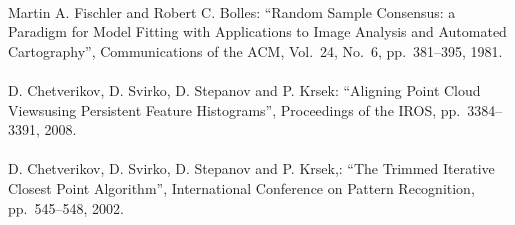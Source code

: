 \begin{mythebibliography}{}
\leavevmode \\Martin A. Fischler and Robert C. Bolles:
\newblock ``Random Sample Consensus: a Paradigm for Model Fitting with Applications to Image Analysis and Automated Cartography'',
\newblock Communications of the ACM, Vol.~24, No.~6, pp.~381--395, 1981.
\\

\leavevmode \\D. Chetverikov, D. Svirko, D. Stepanov and P. Krsek:
\newblock ``Aligning Point Cloud Viewsusing Persistent Feature Histograms'',
\newblock Proceedings of the  IROS, pp.~3384--3391, 2008.
\\

\leavevmode \\D. Chetverikov, D. Svirko, D. Stepanov and P. Krsek,:
\newblock ``The Trimmed Iterative Closest Point Algorithm'',
\newblock  International  Conference  on Pattern Recognition, pp.~545--548, 2002.
\\




%

%
%


%
%
%
%


\end{mythebibliography}
